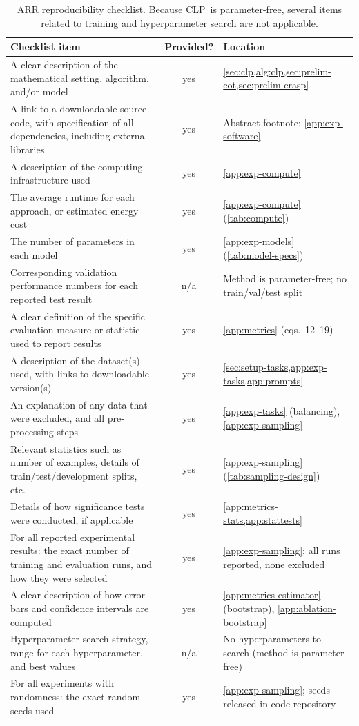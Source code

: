 \documentclass[11pt]{article}
\newcommand{\CLP}{\textsc{CLP}}
\begin{document}
\begin{table}[t]
\centering\small
\setlength{\tabcolsep}{3.5pt}
\begin{tabular}{@{}p{7.5cm}cp{5.5cm}@{}}
\toprule
Checklist item & Provided? & Location \\
\midrule
A clear description of the mathematical setting, algorithm, and/or model
  & yes & \cref{sec:clp,alg:clp,sec:prelim-cot,sec:prelim-crasp} \\
A link to a downloadable source code, with specification of all dependencies,
  including external libraries
  & yes & Abstract footnote; \cref{app:exp-software} \\
A description of the computing infrastructure used
  & yes & \cref{app:exp-compute} \\
The average runtime for each approach, or estimated energy cost
  & yes & \cref{app:exp-compute} (\cref{tab:compute}) \\
The number of parameters in each model
  & yes & \cref{app:exp-models} (\cref{tab:model-specs}) \\
Corresponding validation performance numbers for each reported test result
  & n/a & Method is parameter-free; no train/val/test split \\
A clear definition of the specific evaluation measure or statistic used to
  report results
  & yes & \cref{app:metrics} (eqs.\ 12--19) \\
A description of the dataset(s) used, with links to downloadable version(s)
  & yes & \cref{sec:setup-tasks,app:exp-tasks,app:prompts} \\
An explanation of any data that were excluded, and all pre-processing steps
  & yes & \cref{app:exp-tasks} (balancing), \cref{app:exp-sampling} \\
Relevant statistics such as number of examples, details of train/test/development
  splits, etc.
  & yes & \cref{app:exp-sampling} (\cref{tab:sampling-design}) \\
Details of how significance tests were conducted, if applicable
  & yes & \cref{app:metrics-stats,app:stattests} \\
For all reported experimental results: the exact number of training and evaluation
  runs, and how they were selected
  & yes & \cref{app:exp-sampling}; all runs reported, none excluded \\
A clear description of how error bars and confidence intervals are computed
  & yes & \cref{app:metrics-estimator} (bootstrap), \cref{app:ablation-bootstrap} \\
Hyperparameter search strategy, range for each hyperparameter, and best values
  & n/a & No hyperparameters to search (method is parameter-free) \\
For all experiments with randomness: the exact random seeds used
  & yes & \cref{app:exp-sampling}; seeds released in code repository \\
\bottomrule
\end{tabular}
\caption{ARR reproducibility checklist. Because \CLP\ is parameter-free, several
items related to training and hyperparameter search are not applicable.}
\label{tab:checklist}
\end{table}
\end{document}
